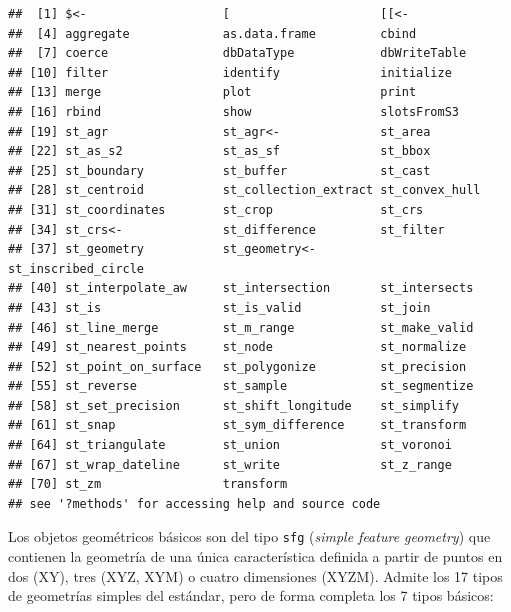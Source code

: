 \documentclass[
  spanish,
]{book}
\theoremstyle{break}
\begin{document}
\begin{verbatim}
##  [1] $<-                   [                     [[<-                 
##  [4] aggregate             as.data.frame         cbind                
##  [7] coerce                dbDataType            dbWriteTable         
## [10] filter                identify              initialize           
## [13] merge                 plot                  print                
## [16] rbind                 show                  slotsFromS3          
## [19] st_agr                st_agr<-              st_area              
## [22] st_as_s2              st_as_sf              st_bbox              
## [25] st_boundary           st_buffer             st_cast              
## [28] st_centroid           st_collection_extract st_convex_hull       
## [31] st_coordinates        st_crop               st_crs               
## [34] st_crs<-              st_difference         st_filter            
## [37] st_geometry           st_geometry<-         st_inscribed_circle  
## [40] st_interpolate_aw     st_intersection       st_intersects        
## [43] st_is                 st_is_valid           st_join              
## [46] st_line_merge         st_m_range            st_make_valid        
## [49] st_nearest_points     st_node               st_normalize         
## [52] st_point_on_surface   st_polygonize         st_precision         
## [55] st_reverse            st_sample             st_segmentize        
## [58] st_set_precision      st_shift_longitude    st_simplify          
## [61] st_snap               st_sym_difference     st_transform         
## [64] st_triangulate        st_union              st_voronoi           
## [67] st_wrap_dateline      st_write              st_z_range           
## [70] st_zm                 transform            
## see '?methods' for accessing help and source code
\end{verbatim}

Los objetos geométricos básicos son del tipo \texttt{sfg} (\emph{simple feature geometry}) que contienen la geometría de una única característica definida a partir de puntos en dos (XY), tres (XYZ, XYM) o cuatro dimensiones (XYZM).
Admite los 17 tipos de geometrías simples del estándar, pero de forma completa los 7 tipos básicos:
\end{document}
